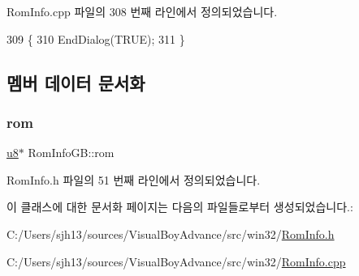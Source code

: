 Rom\+Info.\+cpp 파일의 308 번째 라인에서 정의되었습니다.


\begin{DoxyCode}
309 \{
310   EndDialog(TRUE);
311 \}
\end{DoxyCode}


\subsection{멤버 데이터 문서화}
\mbox{\label{class_rom_info_g_b_ab7ac87e9a9566fce1f057d7c37f60770}} 
\subsubsection{\texorpdfstring{rom}{rom}}
{\footnotesize\ttfamily \mbox{\hyperlink{_system_8h_aed742c436da53c1080638ce6ef7d13de}{u8}}$\ast$ Rom\+Info\+G\+B\+::rom\hspace{0.3cm}{\ttfamily [protected]}}



Rom\+Info.\+h 파일의 51 번째 라인에서 정의되었습니다.



이 클래스에 대한 문서화 페이지는 다음의 파일들로부터 생성되었습니다.\+:\begin{DoxyCompactItemize}
\item 
C\+:/\+Users/sjh13/sources/\+Visual\+Boy\+Advance/src/win32/\mbox{\hyperlink{_rom_info_8h}{Rom\+Info.\+h}}\item 
C\+:/\+Users/sjh13/sources/\+Visual\+Boy\+Advance/src/win32/\mbox{\hyperlink{_rom_info_8cpp}{Rom\+Info.\+cpp}}\end{DoxyCompactItemize}
